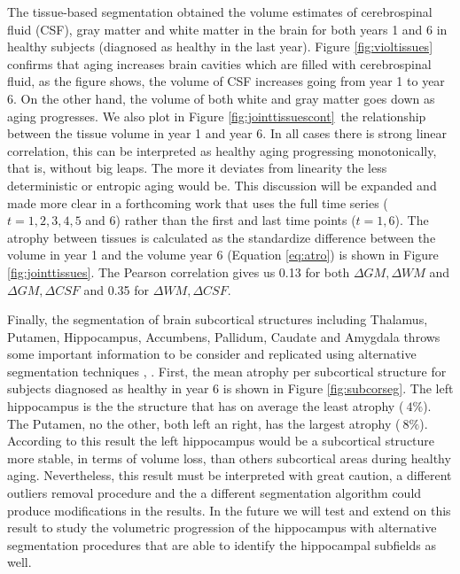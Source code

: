 \documentclass[11pt]{article}
\theoremstyle{definition}
\theoremstyle{remark}
\begin{document}
The tissue-based segmentation obtained the volume estimates of cerebrospinal fluid (CSF), gray matter and white matter in the brain for both years 1 and 6 in healthy subjects (diagnosed as healthy in the last year). Figure \ref{fig:violtissues} confirms that aging increases brain cavities which are filled with cerebrospinal fluid, as the figure shows, the volume of CSF increases going from year 1 to year 6. On the other hand, the volume of both white and gray matter goes down as aging progresses. 
We also plot in Figure \ref{fig:jointtissuescont} the relationship between the tissue volume in year 1 and year 6. In all cases there is strong linear correlation, this can be interpreted as healthy aging progressing monotonically, that is, without big leaps. The more it deviates from linearity the less deterministic or entropic aging would be. This discussion will be expanded and made more clear in a forthcoming work that uses the full time series ($t= 1,2,3,4,5$ and $6$) rather than the first and last time points ($t=1,6$). 
The atrophy between tissues is calculated as the standardize difference between the volume in year 1 and the volume year 6 (Equation \ref{eq:atro}) is shown in Figure \ref{fig:jointtissues}. The Pearson correlation gives us 0.13 for both $\Delta GM, \Delta WM$ and $\Delta GM, \Delta CSF$ and 0.35 for $\Delta WM, \Delta CSF$.

Finally, the segmentation of brain subcortical structures including Thalamus, Putamen, Hippocampus, Accumbens, Pallidum, Caudate and Amygdala \cite{patenaude2011bayesian} throws some important information to be consider and replicated using alternative segmentation techniques \cite{despotovic2015mri}, \cite{zhang2018fully}. 
First, the mean atrophy per subcortical structure for subjects diagnosed as healthy in year 6 is shown in Figure \ref{fig:subcorseg}. The left hippocampus is the the structure that has on average the least atrophy ($~4\%$). The Putamen, no the other, both left an right, has the largest atrophy ($~8\%$). According to this result the left hippocampus would be a subcortical structure more stable, in terms of volume loss, than others subcortical areas during healthy aging. Nevertheless, this result must be interpreted with great caution, a different outliers removal procedure and the a different segmentation algorithm could produce modifications in the results. In the future we will test and extend on this result to study the volumetric progression of the hippocampus with alternative segmentation procedures that are able to identify the hippocampal subfields as well. 
\end{document}
